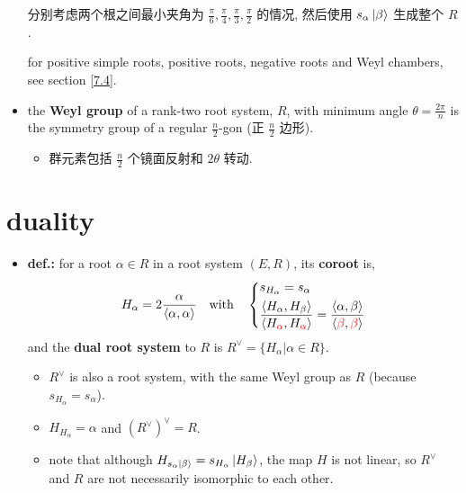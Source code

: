 \begin{itemize}
	分别考虑两个根之间最小夹角为 $\frac{\pi}{6}, \frac{\pi}{4}, \frac{\pi}{3}, \frac{\pi}{2}$ 的情况, 然后使用 $s_\alpha \ket{\beta}$ 生成整个 $R$.
	
	for positive simple roots, positive roots, negative roots and Weyl chambers, see section \ref{7.4}.
	
	\item the \textbf{Weyl group} of a rank-two root system, $R$, with minimum angle $\theta = \frac{2 \pi}{n}$ is the symmetry group of a regular $\frac{n}{2}$-gon (正 $\frac{n}{2}$ 边形).
	\begin{itemize}
		\item 群元素包括 $\frac{n}{2}$ 个镜面反射和 $2 \theta$ 转动.
	\end{itemize}
\end{itemize}

\section{duality}
\begin{itemize}
	\item \textbf{def.:} for a root $\alpha \in R$ in a root system $(E, R)$, its \textbf{coroot} is,
	\begin{equation}
		H_\alpha = 2 \frac{\alpha}{\braket{\alpha, \alpha}} \quad \text{with} \quad \begin{dcases}
			s_{H_\alpha} = s_\alpha \\
			\frac{\braket{H_\alpha, H_\beta}}{\braket{H_{\mathcolor{red}{\alpha}}, H_{\mathcolor{red}{\alpha}}}} = \frac{\braket{\alpha, \beta}}{\braket{\mathcolor{red}{\beta}, \mathcolor{red}{\beta}}}
		\end{dcases}
	\end{equation}
	and the \textbf{dual root system} to $R$ is $R^\vee = \{H_\alpha | \alpha \in R\}$.
	\begin{itemize}
		\item $R^\vee$ is also a root system, with the same Weyl group as $R$ (because $s_{H_\alpha} = s_\alpha$).
		
		\item $H_{H_\alpha} = \alpha$ and $(R^\vee)^\vee = R$.
		
		\item note that although $H_{s_\alpha \ket{\beta}} = s_{H_\alpha} \ket{H_\beta}$, the map $H$ is not linear, so $R^\vee$ and $R$ are not necessarily isomorphic to each other.
	\end{itemize}
\end{itemize}

